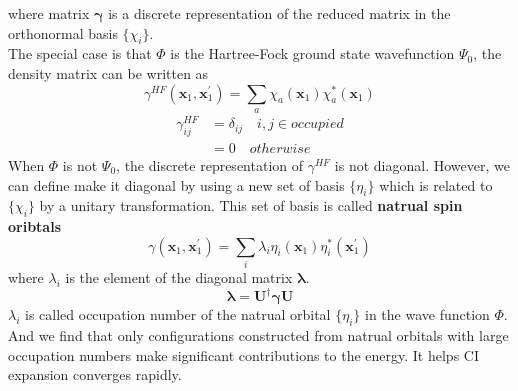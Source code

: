 \documentclass[11pt]{article}
\begin{document}
where matrix $\mathbf{\gamma}$ is a discrete representation of the reduced matrix in the orthonormal basis $\{\chi_i\}$.\\
The special case is that $\Phi$ is the Hartree-Fock ground state wavefunction $\Psi_0$, the density matrix can be written as
\begin{equation}
    \gamma^{HF}(\mathbf{x}_1,\mathbf{x}_1^{'})=\sum_{a}\chi_a(\mathbf{x}_1)\chi_a^*(\mathbf{x}_1)
\end{equation}
\begin{equation}
    \begin{split}
        \gamma_{ij}^{HF}&=\delta_{ij}\quad i,j\in occupied\\
        &=0\quad otherwise
    \end{split}
\end{equation}
When $\Phi$ is not $\Psi_0$, the discrete representation of $\gamma^{HF}$ is not diagonal. However, we can define make it diagonal
by using a new set of basis $\{\eta_i\}$ which is related to $\{\chi_i\}$ by a unitary transformation. This set of basis is called
\textbf{natrual spin oribtals}
\begin{equation}
    \gamma(\mathbf{x}_1,\mathbf{x}_1^{'})=\sum_{i}\lambda_i\eta_i(\mathbf{x}_1)\eta_i^*(\mathbf{x}^{'}_1)
\end{equation}
where $\lambda_i$ is the element of the diagonal matrix $\mathbf{\lambda}$.
\begin{equation}
    \mathbf{\lambda=U^\dagger \gamma U}
\end{equation}
$\lambda_i$ is called occupation number of the natrual orbital $\{\eta_i\}$ in the wave function $\Phi$. And
we find that only configurations constructed from natrual orbitals with large occupation numbers make significant
contributions to the energy. It helps CI expansion converges rapidly.
\end{document}
